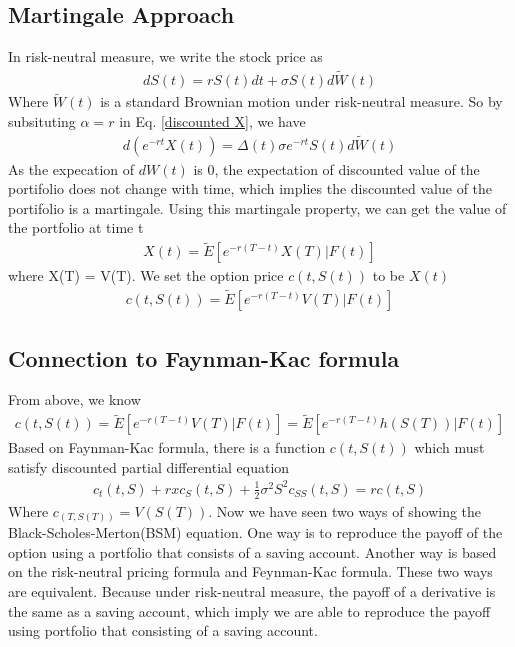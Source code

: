 \documentclass[a4paper]{article}
\begin{document}
\subsection{Martingale Approach}
In risk-neutral measure, we write the stock price as
\begin{align*}
	dS(t) = rS(t) dt + \sigma S(t) d \tilde W(t) 
\end{align*}
Where $\tilde W(t)$ is a standard Brownian motion under risk-neutral measure. So by subsituting $\alpha = r$ in Eq. \ref{discounted X}, we have
\begin{align*}
 d(e^{- r t} X(t)) 
 =  \Delta(t) \sigma e^{-rt} S(t) d \tilde W(t)
\end{align*}
As the expecation of $dW(t)$ is 0, the expectation of discounted value of the portifolio does not change with time, which implies the discounted value of the portifolio is a martingale. Using this martingale property, we can get the value of the portfolio at time t 
\begin{align*}
	X(t) = \tilde E[e^{-r(T-t)}X(T)| F(t)]
\end{align*}
where X(T) = V(T).
We set the option price $c(t, S(t))$ to be $X(t)$
\begin{align*}
	c(t, S(t)) = \tilde E[e^{-r(T-t)}V(T)| F(t)]
\end{align*}
\subsection{Connection to Faynman-Kac formula}
From above, we know
\begin{align}
	c(t, S(t)) = \tilde E[e^{-r(T-t)}V(T)| F(t)] = \tilde E[e^{-r(T-t)}h(S(T))| F(t)] \label{rn}
\end{align}
Based on Faynman-Kac formula, there is a function $c(t,S(t))$ which must satisfy discounted partial differential equation 
\begin{align*}
	c_t(t,S) + rx c_S(t,S) + \frac{1}{2} \sigma^2 S^2 c_{SS}(t,S) = rc(t,S)
\end{align*}
Where $c_(T,S(T)) = V(S(T))$.
Now we have seen two ways of showing the Black-Scholes-Merton(BSM) equation. 
One way is to reproduce the payoff of the option using a portfolio that consists of a 
saving account. Another way is based on the risk-neutral pricing formula and Feynman-Kac formula. 
These two ways are equivalent. Because under risk-neutral measure, the payoff of a derivative is the same as a saving account, which imply we are able to reproduce the payoff using portfolio that consisting of a saving account.
\end{document}
